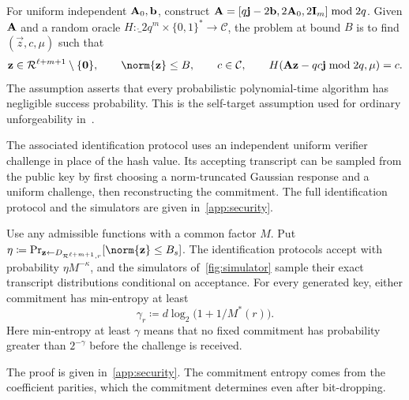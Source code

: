 \begin{definition}
\label{def:self-target}
For uniform independent $\mathbf{A}_0,\mathbf{b}$, construct $\mathbf{A}=[q\mathbf{j}-2\mathbf{b},2\mathbf{A}_0,2\mathbf{I}_m]\bmod2q$. Given $\mathbf{A}$ and a random oracle $H\colon\ring_{2q}^m\times\{0,1\}^*\to\mathcal C$, the problem at bound $B$ is to find $(\vec z,c,\mu)$ such that
\[
 \vec z\in\ring^{\ell+m+1}\setminus\{\vec0\},\qquad
 \norm{\vec z}\le B,\qquad c\in\mathcal C,\qquad
 H(\mat A\vec z-qc\vec j\bmod2q,\mu)=c.
\]
The assumption asserts that every probabilistic polynomial-time algorithm has negligible success probability. This is the self-target assumption used for ordinary unforgeability in~\cite{GartnerFull}.
\end{definition}

The associated identification protocol uses an independent uniform verifier challenge in place of the hash value. Its accepting transcript can be sampled from the public key by first choosing a norm-truncated Gaussian response and a uniform challenge, then reconstructing the commitment. The full identification protocol and the simulators are given in~\cref{app:security}.

\begin{lemma}
\label{lem:simulation}
Use any admissible functions with a common factor $M$. Put $\eta\coloneqq\Pr_{\vec z\leftarrow D_{\ring^{\ell+m+1},r}}[\norm{\vec z}\le B_s]$. The identification protocols accept with probability $\eta M^{-\kappa}$, and the simulators of~\cref{fig:simulator} sample their exact transcript distributions conditional on acceptance. For every generated key, either commitment has min-entropy at least
\begin{equation}
\label{eq:entropy-bound}
 \gamma_r\coloneqq d\log_2\bigl(1+1/M^*(r)\bigr).
\end{equation}
Here min-entropy at least $\gamma$ means that no fixed commitment has probability greater than $2^{-\gamma}$ before the challenge is received.
\end{lemma}

The proof is given in~\cref{app:security}. The commitment entropy comes from the coefficient parities, which the commitment determines even after bit-dropping.

